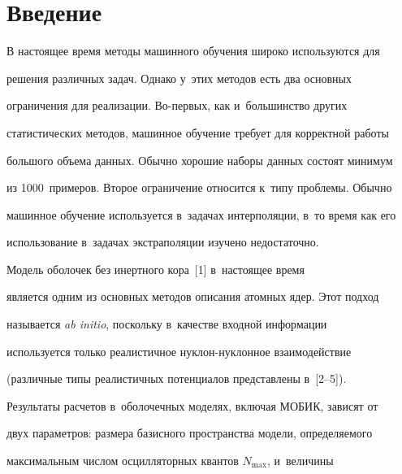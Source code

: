 










\section{Введение}





  В настоящее время методы машинного обуче\-ния широко используются для 


решения различных задач. Однако у~этих методов есть два основных 


ограничения для реализации. Во-пер\-вых, как и~большинство других 


статистических методов, машинное обуче\-ние требует для корректной работы 


большого объема данных. Обычно хорошие наборы данных со\-сто\-ят минимум 


из 1000~примеров. Второе ограничение относится к~типу проб\-ле\-мы. Обычно 


машинное обуче\-ние используется в~задачах интерполяции, в~то время как его 


использование в~задачах экстраполяции изучено недостаточно.


  


  Модель оболочек без инертного кора~[1] в~на\-сто\-ящее время 


является одним из основных методов описания атом\-ных ядер. Этот подход 


называется \textit{ab initio}, поскольку в~качестве вход\-ной информации 


используется только реалистичное нук\-лон-нук\-лон\-ное взаимодействие 


(различные типы реалистичных потенциалов пред\-став\-ле\-ны в~[2--5]). 


  


  Результаты расчетов в~оболочечных моделях, вклю\-чая \mbox{МОБИК}, зависят от 


двух па\-ра\-мет\-ров: размера базисного пространства модели, опре\-де\-ля\-емо\-го 


максимальным чис\-лом осцилляторных квантов $N_{\max}$, и~величины 


